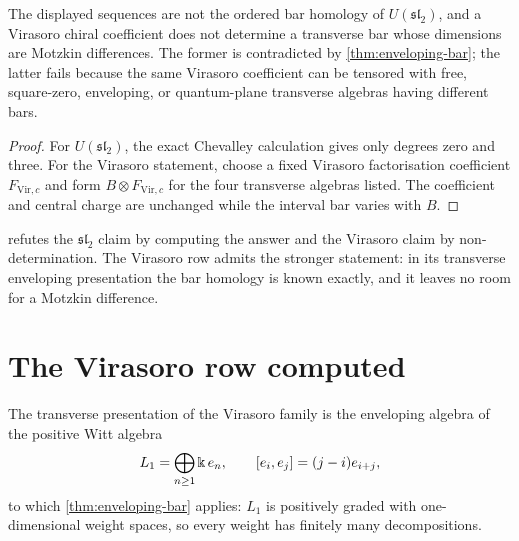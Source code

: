 \begin{theorem}\label{thm:legacy-audit}
The displayed sequences are not the ordered bar homology of \(U(\mathfrak{sl}_2)\), and a Virasoro chiral coefficient does not determine a transverse bar whose dimensions are Motzkin differences.  The former is contradicted by \cref{thm:enveloping-bar}; the latter fails because the same Virasoro coefficient can be tensored with free, square-zero, enveloping, or quantum-plane transverse algebras having different bars.
\end{theorem}
\begin{proof}
For \(U(\mathfrak{sl}_2)\), the exact Chevalley calculation gives only degrees zero and three.  For the Virasoro statement, choose a fixed Virasoro factorisation coefficient \(F_{\mathrm{Vir},c}\) and form \(B\otimes F_{\mathrm{Vir},c}\) for the four transverse algebras listed.  The coefficient and central charge are unchanged while the interval bar varies with \(B\).
\end{proof}

 refutes the \(\mathfrak{sl}_2\) claim by computing the
answer and the Virasoro claim by non-determination.  The Virasoro row admits the
stronger statement: in its transverse enveloping presentation the bar homology is
known exactly, and it leaves no room for a Motzkin difference.

\section{The Virasoro row computed}
The transverse presentation of the Virasoro family is the enveloping algebra of
the positive Witt algebra
\[
 L_1=\bigoplus_{n\ge1}\Bbbk\,e_n,
 \qquad
 [e_i,e_j]=(j-i)e_{i+j},
\]
to which \cref{thm:enveloping-bar} applies: \(L_1\) is positively graded with
one-dimensional weight spaces, so every weight has finitely many decompositions.

